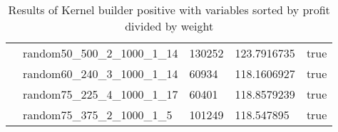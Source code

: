 \begin{table}[!htbp]
{\begin{tabular}{@{}lllll@{}}
                & random50\_500\_2\_1000\_1\_14 & 130252 & 123.7916735 & true \\ 
                & random60\_240\_3\_1000\_1\_14 & 60934 & 118.1606927 & true \\ 
                & random75\_225\_4\_1000\_1\_17 & 60401 & 118.8579239 & true \\ 
                & random75\_375\_2\_1000\_1\_5 & 101249 & 118.547895 & true \\
                \bottomrule
        \end{tabular}
        }
    \caption{Results of Kernel builder positive with variables sorted by profit divided by weight}
    \label{tab:ker_pos_prof_div_wei}
\end{table}
